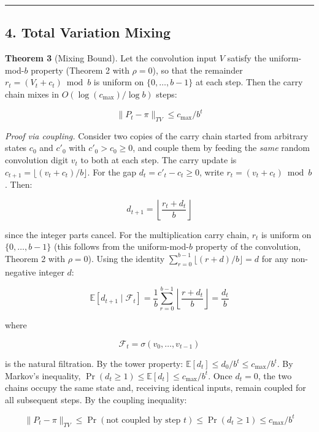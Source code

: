 \documentclass[
  11pt,
]{article}
\begin{document}
\begin{center}\rule{0.5\linewidth}{0.5pt}\end{center}

\newpage

\subsection{4. Total Variation Mixing}\label{total-variation-mixing}

\textbf{Theorem 3} (Mixing Bound). Let the convolution input \(V\) satisfy the
uniform-mod-\(b\) property (Theorem 2 with \(\rho = 0\)), so that the remainder
\(r_t = (V_t + c_t) \bmod b\) is uniform on \(\lbrace{}0, \ldots, b-1\rbrace{}\)
at each step. Then the carry chain mixes in \(O(\log(c_{\max})/\log b)\) steps:

\[\|P_t - \pi\|_{TV} \leq c_{\max}/b^t\]

\emph{Proof via coupling.} Consider two copies of the carry chain started from
arbitrary states \(c_0\) and \(c'_0\) with \(c'_0 > c_0 \geq 0\), and couple
them by feeding the \emph{same} random convolution digit \(v_t\) to both at each
step. The carry update is \(c_{t+1} = \lfloor(v_t + c_t)/b\rfloor\). For the gap
\(d_t = c'_t - c_t \geq 0\), write \(r_t = (v_t + c_t) \bmod b\). Then:

\[d_{t+1} = \left\lfloor\frac{r_t + d_t}{b}\right\rfloor\]

since the integer parts cancel. For the multiplication carry chain, \(r_t\) is
uniform on \(\lbrace{}0, \ldots, b-1\rbrace{}\) (this follows from the
uniform-mod-\(b\) property of the convolution, Theorem 2 with \(\rho = 0\)).
Using the identity \(\sum_{r=0}^{b-1}\lfloor(r+d)/b\rfloor = d\) for any
non-negative integer \(d\):

\[\mathbb{E}[d_{t+1} \mid \mathcal{F}_t] = \frac{1}{b}\sum_{r=0}^{b-1}\left\lfloor\frac{r + d_t}{b}\right\rfloor = \frac{d_t}{b}\]

where

\[\mathcal{F}_t = \sigma(v_0, \ldots, v_{t-1})\]

is the natural filtration. By the tower property:
\(\mathbb{E}[d_t] \leq d_0/b^t \leq c_{\max}/b^t\). By Markov's inequality,
\(\Pr(d_t \geq 1) \leq \mathbb{E}[d_t] \leq c_{\max}/b^t\). Once \(d_t = 0\),
the two chains occupy the same state and, receiving identical inputs, remain
coupled for all subsequent steps. By the coupling inequality:

\[\|P_t - \pi\|_{TV} \leq \Pr(\text{not coupled by step } t) \leq \Pr(d_t \geq 1) \leq c_{\max}/b^t\]
\end{document}
